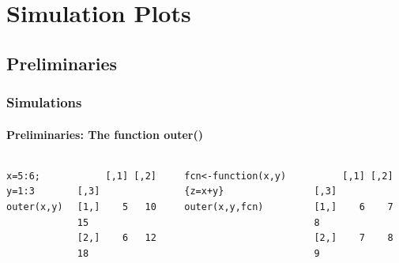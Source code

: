 

\section{Simulation Plots}
\subsection{Preliminaries}

\begin{frame}[fragile]
\frametitle{Simulations}
\framesubtitle{Preliminaries: The function \ttfamily outer() \normalfont}

    \begin{columns}[Tc]
\begin{lstlisting}
x=5:6; y=1:3
outer(x,y)
\end{lstlisting}

\begin{beamerboxesrounded}[shadow=true]{}
\ttfamily
\begin{verbatim}
     [,1] [,2] [,3] 
[1,]    5   10   15 
[2,]    6   12   18 
\end{verbatim}
\end{beamerboxesrounded}
\normalfont

\begin{lstlisting}
fcn<-function(x,y){z=x+y}
outer(x,y,fcn)
\end{lstlisting}

\begin{beamerboxesrounded}[shadow=true]{}
\ttfamily
\begin{verbatim}
     [,1] [,2] [,3] 
[1,]    6    7    8 
[2,]    7    8    9 
\end{verbatim}
\end{beamerboxesrounded}
\normalfont
	\end{columns}
\end{frame}

